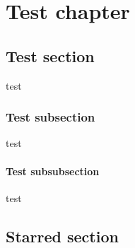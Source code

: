 \documentclass[a4paper,oneside]{memoir}
\begin{document}
\tableofcontents*

\chapter{Test chapter}

\section{Test section}

test
   \tagmcend
 \tagstructend


\subsection{Test subsection}

test
   \tagmcend
 \tagstructend

\subsubsection{Test subsubsection}

test
   \tagmcend
 \tagstructend

\section*{Starred section}
\end{document}
